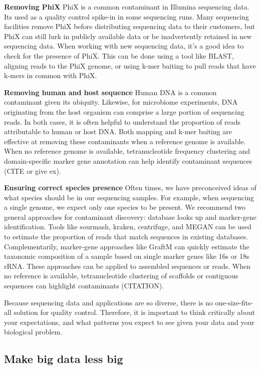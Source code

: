 \documentclass[10pt,letterpaper]{article}
\begin{document}
\textbf{Removing PhiX}
PhiX is a common contaminant in Illumina sequencing data. Its used as a quality control spike-in in some sequencing runs. Many sequencing facilities remove PhiX before distributing sequencing data to their customers, but PhiX can still lurk in publicly available data or be inadvertently retained in new sequencing data. When working with new sequencing data, it’s a good idea to check for the presence of PhiX. This can be done using a tool like BLAST, aligning reads to the PhiX genome, or using k-mer baiting to pull reads that have k-mers in common with PhiX. 

\textbf{Removing human and host sequence}
Human DNA is a common contaminant given its ubiquity. Likewise, for microbiome experiments, DNA originating from the host organism can comprise a large portion of sequencing reads. In both cases, it is often helpful to understand the proportion of reads attributable to human or host DNA. Both mapping and k-mer baiting are effective at removing these contaminants when a reference genome is available. When no reference genome is available, tetranucleotide frequency clustering and domain-specific marker gene annotation can help identify contaminant sequences (CITE or give ex).

\textbf{Ensuring correct species presence }
Often times, we have preconceived ideas of what species should be in our sequencing samples. For example, when sequencing a single genome, we expect only one species to be present. We recommend two general approaches for contaminant discovery: database looks up and marker-gene identification. Tools like sourmash, kraken, centrifuge, and MEGAN can be used to estimate the proportion of reads that match sequences in existing databases. Complementarily, marker-gene approaches like GraftM can quickly estimate the taxonomic composition of a sample based on single marker genes like 16s or 18s rRNA. These approaches can be applied to assembled sequences or reads. When no reference is available, tetranucleotide clustering of scaffolds or contiguous sequences can highlight contaminants (CITATION).%

Because sequencing data and applications are so diverse, there is no one-size-fits-all solution for quality control. Therefore, it is important to think critically about your expectations, and what patterns you expect to see given your data and your biological problem. 

\subsection*{Make big data less big} %
\end{document}
